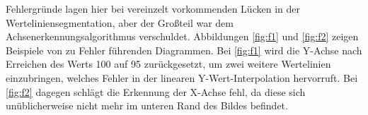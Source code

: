 Fehlergründe lagen hier bei vereinzelt vorkommenden Lücken in der Werteliniensegmentation, aber der Großteil war dem Achsenerkennungsalgorithmus verschuldet. Abbildungen \ref{fig:f1} und \ref{fig:f2} zeigen Beispiele von zu Fehler führenden Diagrammen. Bei \ref{fig:f1} wird die Y-Achse nach Erreichen des Werts 100 auf 95 zurückgesetzt, um zwei weitere Wertelinien einzubringen, welches Fehler in der linearen Y-Wert-Interpolation hervorruft. Bei \ref{fig:f2} dagegen schlägt die Erkennung der X-Achse fehl, da diese sich unüblicherweise nicht mehr im unteren Rand des Bildes befindet.